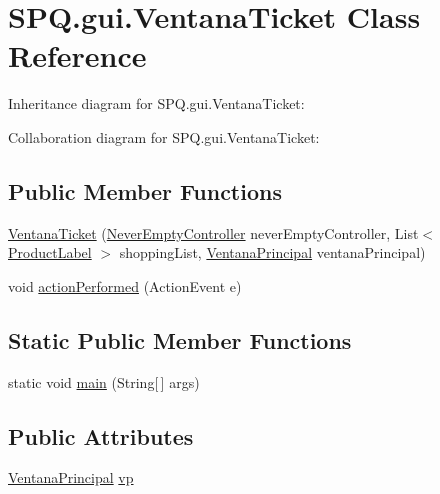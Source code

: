 \hypertarget{class_s_p_q_1_1gui_1_1_ventana_ticket}{}\section{S\+P\+Q.\+gui.\+Ventana\+Ticket Class Reference}
\label{class_s_p_q_1_1gui_1_1_ventana_ticket}


Inheritance diagram for S\+P\+Q.\+gui.\+Ventana\+Ticket\+:


Collaboration diagram for S\+P\+Q.\+gui.\+Ventana\+Ticket\+:
\subsection*{Public Member Functions}
\begin{DoxyCompactItemize}
\item 
\mbox{\hyperlink{class_s_p_q_1_1gui_1_1_ventana_ticket_a27ed535b91869f2e407303220482288e}{Ventana\+Ticket}} (\mbox{\hyperlink{class_s_p_q_1_1controller_1_1_never_empty_controller}{Never\+Empty\+Controller}} never\+Empty\+Controller, List$<$ \mbox{\hyperlink{class_s_p_q_1_1gui_1_1component_1_1_product_label}{Product\+Label}} $>$ shopping\+List, \mbox{\hyperlink{class_s_p_q_1_1gui_1_1_ventana_principal}{Ventana\+Principal}} ventana\+Principal)
\item 
void \mbox{\hyperlink{class_s_p_q_1_1gui_1_1_ventana_ticket_ae0cea5da2b1b3819f0c934775f6c5816}{action\+Performed}} (Action\+Event e)
\end{DoxyCompactItemize}
\subsection*{Static Public Member Functions}
\begin{DoxyCompactItemize}
\item 
static void \mbox{\hyperlink{class_s_p_q_1_1gui_1_1_ventana_ticket_a12b988a7f931a5e82ff48a47c7c07409}{main}} (String\mbox{[}$\,$\mbox{]} args)
\end{DoxyCompactItemize}
\subsection*{Public Attributes}
\begin{DoxyCompactItemize}
\item 
\mbox{\hyperlink{class_s_p_q_1_1gui_1_1_ventana_principal}{Ventana\+Principal}} \mbox{\hyperlink{class_s_p_q_1_1gui_1_1_ventana_ticket_a0aef577c7b99bffe0ff8a050c7cc63c0}{vp}}
\end{DoxyCompactItemize}


